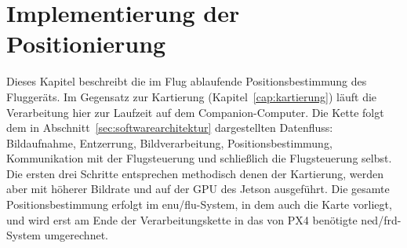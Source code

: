 
%
%
%
%
%
%
%
%

\chapter{Implementierung der Positionierung}
\label{cap:lokalisierung}
Dieses Kapitel beschreibt die im Flug ablaufende Positionsbestimmung des Fluggeräts.
Im Gegensatz zur Kartierung (Kapitel~\ref{cap:kartierung}) läuft die Verarbeitung hier zur Laufzeit auf dem Companion-Computer.
Die Kette folgt dem in Abschnitt~\ref{sec:softwarearchitektur} dargestellten Datenfluss: Bildaufnahme, Entzerrung, Bildverarbeitung, Positionsbestimmung, 
Kommunikation mit der Flugsteuerung und schließlich die Flugsteuerung selbst.
Die ersten drei Schritte entsprechen methodisch denen der Kartierung, werden aber mit höherer Bildrate und auf der GPU des Jetson ausgeführt.
Die gesamte Positionsbestimmung erfolgt im \gls{enu}/\gls{flu}-System, in dem auch die Karte vorliegt, und wird erst am 
Ende der Verarbeitungskette in das von PX4 benötigte \gls{ned}/\gls{frd}-System umgerechnet.



